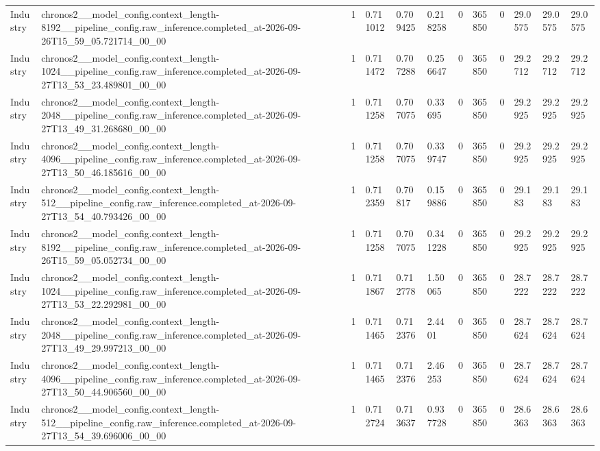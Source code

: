 \begin{tabular}{llllllllllll}
Industry & chronos2\_\_model\_config.context\_length-8192\_\_pipeline\_config.raw\_inference.completed\_at-2026-09-26T15\_59\_05.721714\_00\_00 & 1 & 0.711012 & 0.709425 & 0.218258 & 0 & 365850 & 0 & 29.0575 & 29.0575 & 29.0575 \\
Industry & chronos2\_\_model\_config.context\_length-1024\_\_pipeline\_config.raw\_inference.completed\_at-2026-09-27T13\_53\_23.489801\_00\_00 & 1 & 0.711472 & 0.707288 & 0.256647 & 0 & 365850 & 0 & 29.2712 & 29.2712 & 29.2712 \\
Industry & chronos2\_\_model\_config.context\_length-2048\_\_pipeline\_config.raw\_inference.completed\_at-2026-09-27T13\_49\_31.268680\_00\_00 & 1 & 0.711258 & 0.707075 & 0.33695 & 0 & 365850 & 0 & 29.2925 & 29.2925 & 29.2925 \\
Industry & chronos2\_\_model\_config.context\_length-4096\_\_pipeline\_config.raw\_inference.completed\_at-2026-09-27T13\_50\_46.185616\_00\_00 & 1 & 0.711258 & 0.707075 & 0.339747 & 0 & 365850 & 0 & 29.2925 & 29.2925 & 29.2925 \\
Industry & chronos2\_\_model\_config.context\_length-512\_\_pipeline\_config.raw\_inference.completed\_at-2026-09-27T13\_54\_40.793426\_00\_00 & 1 & 0.712359 & 0.70817 & 0.159886 & 0 & 365850 & 0 & 29.183 & 29.183 & 29.183 \\
Industry & chronos2\_\_model\_config.context\_length-8192\_\_pipeline\_config.raw\_inference.completed\_at-2026-09-26T15\_59\_05.052734\_00\_00 & 1 & 0.711258 & 0.707075 & 0.341228 & 0 & 365850 & 0 & 29.2925 & 29.2925 & 29.2925 \\
Industry & chronos2\_\_model\_config.context\_length-1024\_\_pipeline\_config.raw\_inference.completed\_at-2026-09-27T13\_53\_22.292981\_00\_00 & 1 & 0.711867 & 0.712778 & 1.50065 & 0 & 365850 & 0 & 28.7222 & 28.7222 & 28.7222 \\
Industry & chronos2\_\_model\_config.context\_length-2048\_\_pipeline\_config.raw\_inference.completed\_at-2026-09-27T13\_49\_29.997213\_00\_00 & 1 & 0.711465 & 0.712376 & 2.4401 & 0 & 365850 & 0 & 28.7624 & 28.7624 & 28.7624 \\
Industry & chronos2\_\_model\_config.context\_length-4096\_\_pipeline\_config.raw\_inference.completed\_at-2026-09-27T13\_50\_44.906560\_00\_00 & 1 & 0.711465 & 0.712376 & 2.46253 & 0 & 365850 & 0 & 28.7624 & 28.7624 & 28.7624 \\
Industry & chronos2\_\_model\_config.context\_length-512\_\_pipeline\_config.raw\_inference.completed\_at-2026-09-27T13\_54\_39.696006\_00\_00 & 1 & 0.712724 & 0.713637 & 0.937728 & 0 & 365850 & 0 & 28.6363 & 28.6363 & 28.6363 \\

\end{tabular}
